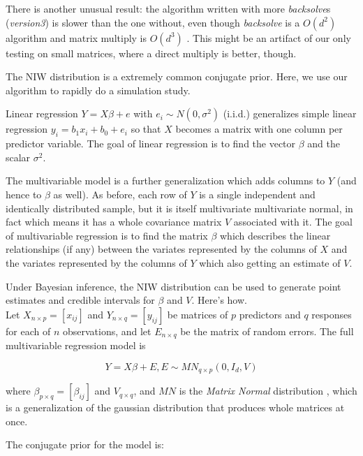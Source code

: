 \documentclass[english]{report}
\begin{document}
There is another unusual result: the algorithm written with more \emph{backsolve}s (\emph{version3}) is slower than the one without, even though \emph{backsolve} is a $O(d^2)$ algorithm and matrix multiply is $O(d^3)$ \cite{?????}. This might be an artifact of our only testing on small matrices, where a direct multiply is better, though.


The NIW distribution is a extremely common conjugate prior. Here, we use our algorithm to rapidly do a simulation study.


Linear regression $Y = X\beta + e$ with $e_i \sim N(0, \sigma^2)$ (i.i.d.) generalizes simple linear regression $y_i = b_1 x_i + b_0 + e_i$ so that $X$ becomes a matrix with one column per predictor variable. The goal of linear regression is to find the vector $\beta$ and the scalar $\sigma^2$.

The multivariable model is a further generalization which adds columns to $Y$ (and hence to $\beta$ as well). As before, each row of $Y$ is a single independent and identically distributed sample, but it is itself multivariate \textendash multivariate normal, in fact \textendash which means it has a whole covariance matrix $V$ associated with it. The goal of multivariable regression is to find the matrix $\beta$ which describes the linear relationships (if any) between the variates represented by the columns of $X$ and the variates represented by the columns of $Y$ which also getting an estimate of $V$.

Under Bayesian inference, the NIW distribution can be used to generate point estimates and credible intervals for $\beta$ and $V$. Here's how.\\

Let $X_{n\times p} = [x_{ij}]$ and $Y_{n\times q} = [y_{ij}]$ be matrices of $p$ predictors and $q$ responses for each of $n$ observations, and let $E_{n\times q}$ be the matrix of random errors. The full multivariable regression model is

\[Y = X\beta + E, E \sim MN_{q \times p}(0, I_d, V)\]

where $\beta_{p\times q} = [\beta_{ij}] $ and $V_{q\times q}$, and $MN$ is the \emph{Matrix Normal} distribution \cite{MatrixNormal}, which is a generalization of the gaussian distribution that produces whole matrices at once.

The conjugate prior for the model is:
\end{document}
